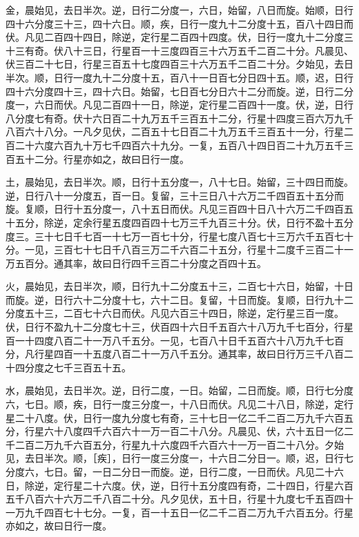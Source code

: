 \documentclass[]{article}
\begin{document}
金，晨始见，去日半次。逆，日行二分度一，六日，始留，八日而旋。始顺，日行四十六分度三十三，四十六日。顺，疾，日行一度九十二分度十五，百八十四日而伏。凡见二百四十四日，除逆，定行星二百四十四度。伏，日行一度九十二分度三十三有奇。伏八十三日，行星百一十三度四百三十六万五千二百二十分。凡晨见、伏三百二十七日，行星三百五十七度四百三十六万五千二百二十分。夕始见，去日半次。顺，日行一度九十二分度十五，百八十一日百七分日四十五。顺，迟，日行四十六分度四十三，四十六日。始留，七日百七分日六十二分而旋。逆，日行二分度一，六日而伏。凡见二百四十一日，除逆，定行星二百四十一度。伏，逆，日行八分度七有奇。伏十六日百二十九万五千三百五十二分，行星十四度三百六万九千八百六十八分。一凡夕见伏，二百五十七日百二十九万五千三百五十一分，行星二百二十六度六百九十万七千四百六十九分。一复，五百八十四日百二十九万五千三百五十二分。行星亦如之，故曰日行一度。

土，晨始见，去日半次。顺，日行十五分度一，八十七日。始留，三十四日而旋。逆，日行八十一分度五，百一日。复留，三十三日八十六万二千四百五十五分而旋。复顺，日行十五分度一，八十五日而伏。凡见三百四十日八十六万二千四百五十五分，除逆，定余行星五度四百四十七万三千九百三十分。伏，日行不盈十五分度三。三十七日千七百一十七万一百七十分，行星七度八百七十三万六千五百七十分。一见，三百七十七日千八百三万二千六百二十五分，行星十二度千三百二十一万五百分。通其率，故曰日行四千三百二十分度之百四十五。

火，晨始见，去日半次，顺，日行九十二分度五十三，二百七十六日，始留，十日而旋。逆，日行六十二分度十七，六十二日。复留，十日而旋。复顺，日行九十二分度五十三，二百七十六日而伏。凡见六百三十四日，除逆，定行星三百一度。伏，日行不盈九十二分度七十三，伏百四十六日千五百六十八万九千七百分，行星百一十四度八百二十一万八千五分。一见，七百八十日千五百六十八万九千七百分，凡行星四百一十五度八百二十一万八千五分。通其率，故曰日行万三千八百二十四分度之七千三百五十五。

水，晨始见，去日半次。逆，日行二度，一日。始留，二日而旋。顺，日行七分度六，七日。顺，疾，日行一度三分度一，十八日而伏。凡见二十八日，除逆，定行星二十八度。伏，日行一度九分度七有奇，三十七日一亿二千二百二万九千六百五分，行星六十八度四千六百六十一万一百二十八分。凡晨见、伏，六十五日一亿二千二百二万九千六百五分，行星九十六度四千六百六十一万一百二十八分。夕始见，去日半次。顺，［疾］，日行一度三分度一，十六日二分日一。顺，迟，日行七分度六，七日。留，一日二分日一而旋。逆，日行二度，一日而伏。凡见二十六日，除逆，定行星二十六度。伏，逆，日行十五分度四有奇，二十四日，行星六百五千八百六十六万二千八百二十分。凡夕见伏，五十日，行星十九度七千五百四十一万九千四百七十七分。一复，百一十五日一亿二千二百二万九千六百五分。行星亦如之，故曰日行一度。
\end{document}
